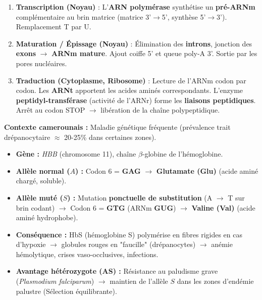 \documentclass[11pt]{article}
\begin{document}
\begin{methode}
\begin{enumerate}
    \item \textbf{Transcription (Noyau)} : L'\textbf{ARN polymérase} synthétise un \textbf{pré-ARNm} complémentaire au brin matrice (matrice 3'$\to$5', synthèse 5'$\to$3'). Remplacement T par U.
    \item \textbf{Maturation / Épissage (Noyau)} : Élimination des \textbf{introns}, jonction des \textbf{exons} $\to$ \textbf{ARNm mature}. Ajout coiffe 5' et queue poly-A 3'. Sortie par les pores nucléaires.
    \item \textbf{Traduction (Cytoplasme, Ribosome)} : Lecture de l'ARNm codon par codon. Les \textbf{ARNt} apportent les acides aminés correspondants. L'enzyme \textbf{peptidyl-transférase} (activité de l'ARNr) forme les \textbf{liaisons peptidiques}. Arrêt au codon STOP $\to$ libération de la chaîne polypeptidique.
\end{enumerate}
\end{methode}

\begin{exemplebox}
\textbf{Contexte camerounais :} Maladie génétique fréquente (prévalence trait drépanocytaire $\approx$ 20-25\% dans certaines zones).
\begin{itemize}
    \item \textbf{Gène :} \emph{HBB} (chromosome 11), chaîne $\beta$-globine de l'hémoglobine.
    \item \textbf{Allèle normal ($A$) :} Codon 6 = \textbf{GAG} $\to$ \textbf{Glutamate (Glu)} (acide aminé chargé, soluble).
    \item \textbf{Allèle muté ($S$) :} Mutation \textbf{ponctuelle de substitution} (A $\to$ T sur brin codant) $\to$ Codon 6 = \textbf{GTG} (ARNm \textbf{GUG}) $\to$ \textbf{Valine (Val)} (acide aminé hydrophobe).
    \item \textbf{Conséquence :} HbS (hémoglobine S) polymérise en fibres rigides en cas d'hypoxie $\to$ globules rouges en "faucille" (drépanocytes) $\to$ anémie hémolytique, crises vaso-occlusives, infections.
    \item \textbf{Avantage hétérozygote (AS) :} Résistance au paludisme grave (\emph{Plasmodium falciparum}) $\to$ maintien de l'allèle $S$ dans les zones d'endémie palustre (Sélection équilibrante).
\end{itemize}
\end{exemplebox}
\end{document}
